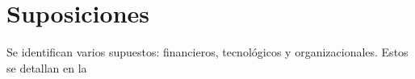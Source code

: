 \section{Suposiciones}
\label{section:suposiciones}

Se identifican varios supuestos: financieros, tecnológicos y organizacionales. Estos se detallan en la 


%
%
